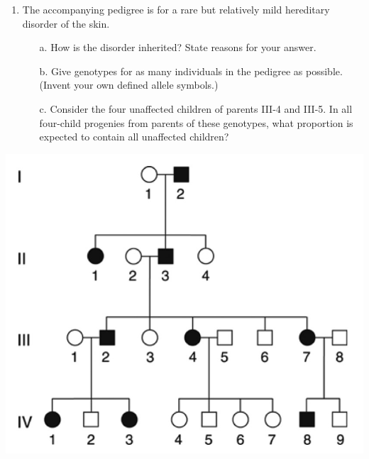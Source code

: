 \documentclass[11pt,]{article}
\providecommand{\tightlist}{%
  \setlength{\itemsep}{0pt}\setlength{\parskip}{0pt}}
\begin{document}
\begin{blackbox}

\begin{enumerate}
\def\labelenumi{\arabic{enumi}.}
\setcounter{enumi}{49}
\tightlist
\item
  The accompanying pedigree is for a rare but relatively mild hereditary
  disorder of the skin.

  \begin{enumerate} 
   \item[a.]{ How is the disorder inherited? State reasons for your answer. } 
   \item[b.]{ Give genotypes for as many individuals in the pedigree as possible. (Invent your own defined allele symbols.) } 
   \item[c.]{ Consider the four unaffected children of parents III-4 and III-5. In all four-child progenies from parents of these genotypes, what proportion is expected to contain all unaffected children? } 
   \end{enumerate}
\end{enumerate}

\hfill\break

\begin{center}\includegraphics[width=0.55\linewidth,]{input/50pedigree} \end{center}

\vspace{9cm}

\end{blackbox}
\end{document}
